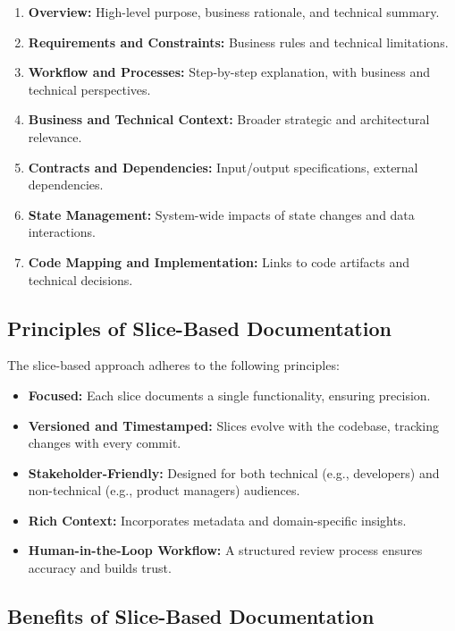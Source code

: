 \documentclass[12pt,oneside]{article}
\begin{document}
\begin{enumerate}
    \item \textbf{Overview:} High-level purpose, business rationale, and technical summary.
    \item \textbf{Requirements and Constraints:} Business rules and technical limitations.
    \item \textbf{Workflow and Processes:} Step-by-step explanation, with business and technical perspectives.
    \item \textbf{Business and Technical Context:} Broader strategic and architectural relevance.
    \item \textbf{Contracts and Dependencies:} Input/output specifications, external dependencies.
    \item \textbf{State Management:} System-wide impacts of state changes and data interactions.
    \item \textbf{Code Mapping and Implementation:} Links to code artifacts and technical decisions.
\end{enumerate}

\subsection{Principles of Slice-Based Documentation}

The slice-based approach adheres to the following principles:
\begin{itemize}
    \item \textbf{Focused:} Each slice documents a single functionality, ensuring precision.
    \item \textbf{Versioned and Timestamped:} Slices evolve with the codebase, tracking changes with every commit.
    \item \textbf{Stakeholder-Friendly:} Designed for both technical (e.g., developers) and non-technical (e.g., product managers) audiences.
    \item \textbf{Rich Context:} Incorporates metadata and domain-specific insights.
    \item \textbf{Human-in-the-Loop Workflow:} A structured review process ensures accuracy and builds trust.
\end{itemize}

\subsection{Benefits of Slice-Based Documentation}
\end{document}

